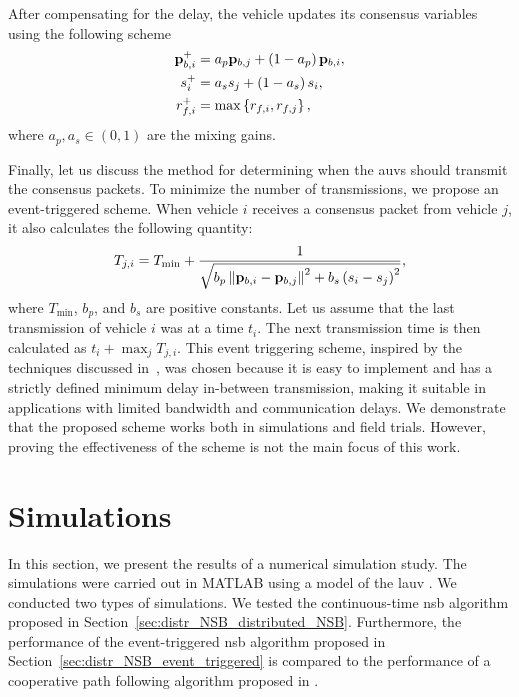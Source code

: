 After compensating for the delay, the vehicle updates its consensus variables using the following scheme
\begin{align}
    \mathbf{p}_{b, i}^{+} &= a_p \mathbf{p}_{b, j} + \left(1 - a_p\right) \mathbf{p}_{b, i}, \\
    s_i^{+} &= a_s s_j + \left(1 - a_s\right) s_i, \\
    r_{f, i}^{+} &= \max\left\{r_{f, i}, r_{f, j}\right\},
\end{align}
where $a_p, a_s \in (0, 1)$ are the mixing gains.

Finally, let us discuss the method for determining when the \glspl{auv} should transmit the consensus packets.
To minimize the number of transmissions, we propose an event-triggered scheme.
When vehicle $i$ receives a consensus packet from vehicle $j$, it also calculates the following quantity:
\begin{equation}
    T_{j,i} = T_{\min} + \frac{1}{\sqrt{b_p\left\|\mathbf{p}_{b, i} - \mathbf{p}_{b, j}\right\|^2 + b_s\left(s_i - s_j\right)^2}},
\end{equation}
where $T_{\min}$, $b_p$, and $b_s$ are positive constants.
Let us assume that the last transmission of vehicle $i$ was at a time $t_i$.
The next transmission time is then calculated as $t_i + \max_j T_{j, i}$.
This event triggering scheme, inspired by the techniques discussed in~\cite{ding2017overview}, was chosen because it is easy to implement and has a strictly defined minimum delay in-between transmission, making it suitable in applications with limited bandwidth and communication delays. We demonstrate that the proposed scheme works both in simulations and field trials. However, proving the effectiveness of the scheme is not the main focus of this work.%

\section{Simulations}
\label{sec:distr_NSB_simulations}

In this section, we present the results of a numerical simulation study.
The simulations were carried out in MATLAB using a model of the \acrfull{lauv} \cite{sousa_LAUV_2012}.
We conducted two types of simulations. 
We tested the continuous-time \gls{nsb} algorithm proposed in Section~\ref{sec:distr_NSB_distributed_NSB}.
Furthermore, the performance of the event-triggered \gls{nsb} algorithm proposed in Section~\ref{sec:distr_NSB_event_triggered} is compared to the performance of a cooperative path following algorithm proposed in \cite{praveen_cooperative_2018}.

